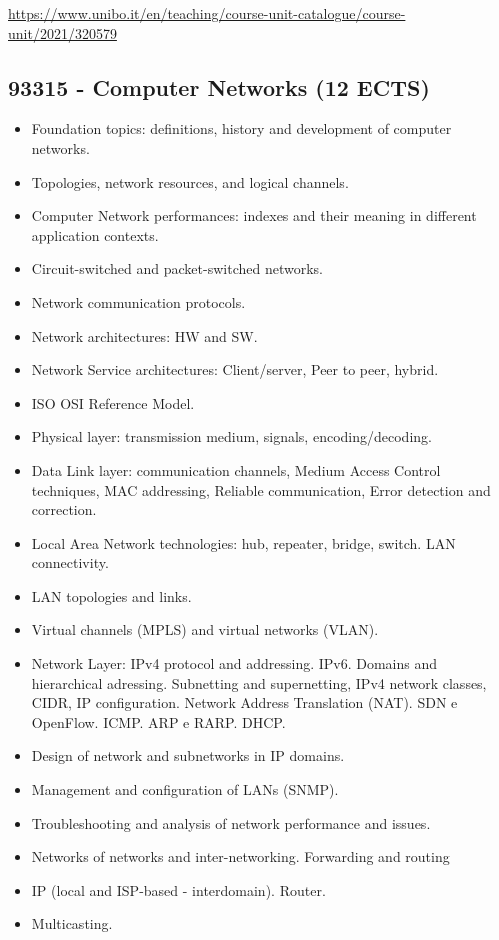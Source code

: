 \documentclass{article}
\begin{document}
\url{https://www.unibo.it/en/teaching/course-unit-catalogue/course-unit/2021/320579}

\subsection{93315 - Computer Networks (12 ECTS)}
\begin{itemize}
\item Foundation topics: definitions, history and development of computer networks.
\item Topologies, network resources, and logical channels.
\item Computer Network performances: indexes and their meaning in different application contexts.
\item Circuit-switched and packet-switched networks.
\item Network communication protocols.
\item Network architectures: HW and SW.
\item Network Service architectures: Client/server, Peer to peer, hybrid.
\item ISO OSI Reference Model.
\item Physical layer: transmission medium, signals, encoding/decoding.
\item Data Link layer: communication channels, Medium Access Control techniques, MAC addressing, Reliable communication, Error detection and correction.
\item Local Area Network technologies: hub, repeater, bridge, switch. LAN connectivity.
\item LAN topologies and links.
\item Virtual channels (MPLS) and virtual networks (VLAN).
\item Network Layer: IPv4 protocol and addressing. IPv6. Domains and hierarchical adressing. Subnetting and supernetting, IPv4 network classes, CIDR, IP configuration. Network Address Translation (NAT). SDN e OpenFlow. ICMP. ARP e RARP. DHCP.
\item Design of network and subnetworks in IP domains.
\item Management and configuration of LANs (SNMP).
\item Troubleshooting and analysis of network performance and issues.
\item Networks of networks and inter-networking. Forwarding and routing \item IP (local and ISP-based - interdomain). Router.
\item Multicasting.

\end{itemize}
\end{document}

